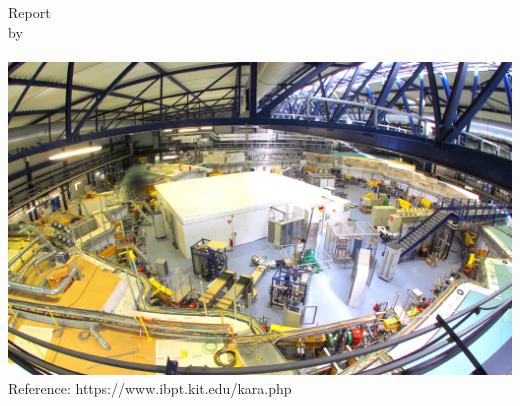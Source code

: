 \begin{titlepage}
    \vspace*{1cm}
    \Large Report\\by\\
    \vspace*{1cm}
    \huge\thesisauthor\\




    \vspace*{1.5cm}
    \includegraphics[scale=0.45]{./include/KIT_synchrotron_light_source_hall_view.jpg}\\
    \small{Reference: https://www.ibpt.kit.edu/kara.php}







\end{titlepage}
